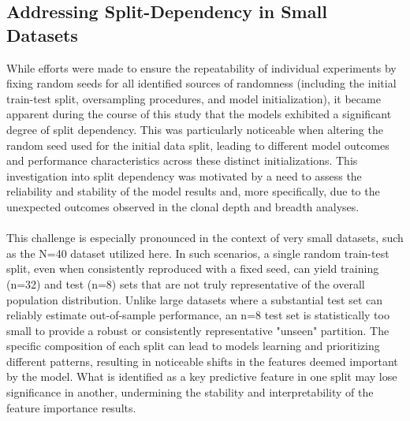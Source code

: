 \documentclass[12pt,a4paper]{report}
\begin{document}
\subsection{Addressing Split-Dependency in Small Datasets}
\noindent
While efforts were made to ensure the repeatability of individual experiments by fixing random seeds for all identified sources of randomness (including the initial train-test split, oversampling procedures, and model initialization), it became apparent during the course of this study that the models exhibited a significant degree of split dependency. This was particularly noticeable when altering the random seed used for the initial data split, leading to different model outcomes and performance characteristics across these distinct initializations. This investigation into split dependency was motivated by a need to assess the reliability and stability of the model results and, more specifically, due to the unexpected outcomes observed in the clonal depth and breadth analyses.\\
\\
This challenge is especially pronounced in the context of very small datasets, such as the N=40 dataset utilized here. In such scenarios, a single random train-test split, even when consistently reproduced with a fixed seed, can yield training (n=32) and test (n=8) sets that are not truly representative of the overall population distribution. Unlike large datasets where a substantial test set can reliably estimate out-of-sample performance, an n=8 test set is statistically too small to provide a robust or consistently representative "unseen" partition. The specific composition of each split can lead to models learning and prioritizing different patterns, resulting in noticeable shifts in the features deemed important by the model. What is identified as a key predictive feature in one split may lose significance in another, undermining the stability and interpretability of the feature importance results.\\
\\
\end{document}

